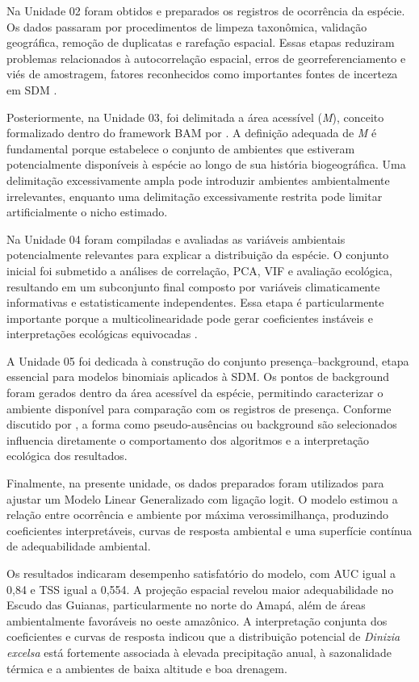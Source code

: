 Na Unidade 02 foram obtidos e preparados os registros de ocorrência da espécie. Os dados passaram por procedimentos de limpeza taxonômica, validação geográfica, remoção de duplicatas e rarefação espacial. Essas etapas reduziram problemas relacionados à autocorrelação espacial, erros de georreferenciamento e viés de amostragem, fatores reconhecidos como importantes fontes de incerteza em SDM \citep{kramer2003spatial,boria2014spatial}.

Posteriormente, na Unidade 03, foi delimitada a área acessível (\textit{M}), conceito formalizado dentro do framework BAM por \citet{soberon2007grinnellian}. A definição adequada de \textit{M} é fundamental porque estabelece o conjunto de ambientes que estiveram potencialmente disponíveis à espécie ao longo de sua história biogeográfica. Uma delimitação excessivamente ampla pode introduzir ambientes ambientalmente irrelevantes, enquanto uma delimitação excessivamente restrita pode limitar artificialmente o nicho estimado.

Na Unidade 04 foram compiladas e avaliadas as variáveis ambientais potencialmente relevantes para explicar a distribuição da espécie. O conjunto inicial foi submetido a análises de correlação, PCA, VIF e avaliação ecológica, resultando em um subconjunto final composto por variáveis climaticamente informativas e estatisticamente independentes. Essa etapa é particularmente importante porque a multicolinearidade pode gerar coeficientes instáveis e interpretações ecológicas equivocadas \citep{dormann2013collinearity}.

A Unidade 05 foi dedicada à construção do conjunto presença--background, etapa essencial para modelos binomiais aplicados à SDM. Os pontos de background foram gerados dentro da área acessível da espécie, permitindo caracterizar o ambiente disponível para comparação com os registros de presença. Conforme discutido por \citet{barbetmassin2012selecting}, a forma como pseudo-ausências ou background são selecionados influencia diretamente o comportamento dos algoritmos e a interpretação ecológica dos resultados.

Finalmente, na presente unidade, os dados preparados foram utilizados para ajustar um Modelo Linear Generalizado com ligação logit. O modelo estimou a relação entre ocorrência e ambiente por máxima verossimilhança, produzindo coeficientes interpretáveis, curvas de resposta ambiental e uma superfície contínua de adequabilidade ambiental.

Os resultados indicaram desempenho satisfatório do modelo, com AUC igual a 0,84 e TSS igual a 0,554. A projeção espacial revelou maior adequabilidade no Escudo das Guianas, particularmente no norte do Amapá, além de áreas ambientalmente favoráveis no oeste amazônico. A interpretação conjunta dos coeficientes e curvas de resposta indicou que a distribuição potencial de \textit{Dinizia excelsa} está fortemente associada à elevada precipitação anual, à sazonalidade térmica e a ambientes de baixa altitude e boa drenagem.

